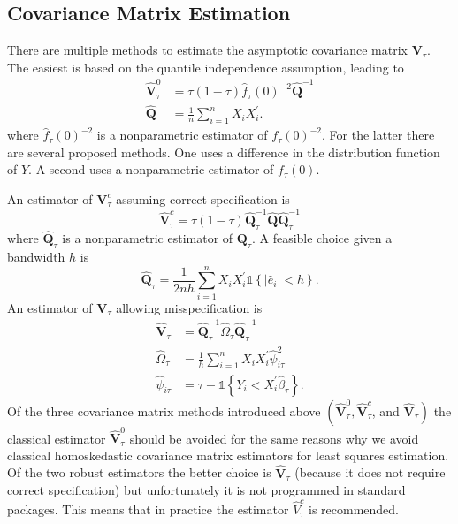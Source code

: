 \documentclass[10pt]{article}
\begin{document}
\subsection{Covariance Matrix Estimation}
There are multiple methods to estimate the asymptotic covariance matrix $\boldsymbol{V}_{\tau}$. The easiest is based on the quantile independence assumption, leading to
$$
\begin{aligned}
\widehat{\boldsymbol{V}}_{\tau}^{0} &=\tau(1-\tau) \widehat{f}_{\tau}(0)^{-2} \widehat{\boldsymbol{Q}}^{-1} \\
\widehat{\boldsymbol{Q}} &=\frac{1}{n} \sum_{i=1}^{n} X_{i} X_{i}^{\prime} .
\end{aligned}
$$
where $\widehat{f}_{\tau}(0)^{-2}$ is a nonparametric estimator of $f_{\tau}(0)^{-2}$. For the latter there are several proposed methods. One uses a difference in the distribution function of $Y$. A second uses a nonparametric estimator of $f_{\tau}(0)$.

An estimator of $\boldsymbol{V}_{\tau}^{c}$ assuming correct specification is
$$
\widehat{\boldsymbol{V}}_{\tau}^{c}=\tau(1-\tau) \widehat{\boldsymbol{Q}}_{\tau}^{-1} \widehat{\boldsymbol{Q}} \widehat{\boldsymbol{Q}}_{\tau}^{-1}
$$
where $\widehat{\boldsymbol{Q}}_{\tau}$ is a nonparametric estimator of $\boldsymbol{Q}_{\tau}$. A feasible choice given a bandwidth $h$ is
$$
\widehat{\boldsymbol{Q}}_{\tau}=\frac{1}{2 n h} \sum_{i=1}^{n} X_{i} X_{i}^{\prime} \mathbb{1}\left\{\left|\widehat{e}_{i}\right|<h\right\} .
$$
An estimator of $\boldsymbol{V}_{\tau}$ allowing misspecification is
$$
\begin{aligned}
\widehat{\boldsymbol{V}}_{\tau} &=\widehat{\boldsymbol{Q}}_{\tau}^{-1} \widehat{\Omega}_{\tau} \widehat{\boldsymbol{Q}}_{\tau}^{-1} \\
\widehat{\Omega}_{\tau} &=\frac{1}{h} \sum_{i=1}^{n} X_{i} X_{i}^{\prime} \widehat{\psi}_{i \tau}^{2} \\
\widehat{\psi}_{i \tau} &=\tau-\mathbb{1}\left\{Y_{i}<X_{i}^{\prime} \widehat{\beta}_{\tau}\right\} .
\end{aligned}
$$
Of the three covariance matrix methods introduced above $\left(\widehat{\boldsymbol{V}}_{\tau}^{0}, \widehat{\boldsymbol{V}}_{\tau}^{c}\right.$, and $\left.\widehat{\boldsymbol{V}}_{\tau}\right)$ the classical estimator $\widehat{\boldsymbol{V}}_{\tau}^{0}$ should be avoided for the same reasons why we avoid classical homoskedastic covariance matrix estimators for least squares estimation. Of the two robust estimators the better choice is $\widehat{\boldsymbol{V}}_{\tau}$ (because it does not require correct specification) but unfortunately it is not programmed in standard packages. This means that in practice the estimator $\widehat{V}_{\tau}^{c}$ is recommended.
\end{document}
